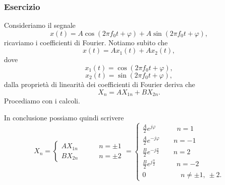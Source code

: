 \documentclass[12pt,oneside,openany]{memoir}
\numberwithin{equation}{subsection}
\begin{document}

\subsubsection{Esercizio}
Consideriamo il segnale
\begin{equation}
	x(t) = A \cos(2 \pi f_0 t + \varphi) + A \sin(2 \pi f_0 t + \varphi),
\end{equation}
ricaviamo i coefficienti di Fourier.
\bigbreak\noindent
Notiamo subito che
\begin{equation}
	x(t) = A x_1(t) + A x_2(t),
\end{equation}
dove
\begin{equation}
	x_1(t) = \cos(2 \pi f_0 t + \varphi),
\end{equation}
\begin{equation}
	x_2(t) = \sin(2 \pi f_0 t + \varphi),
\end{equation}
dalla propriet\`a di linearit\`a dei coefficienti di Fourier deriva che
\begin{equation}
	X_n = A X_{1n} + B X_{2n}.
\end{equation}
Procediamo con i calcoli.

In conclusione possiamo quindi scrivere
\begin{equation}
	X_n =
		\begin{cases}
			A X_{1n} \quad\quad\quad n = \pm 1\\
			B X_{2n} \quad\quad\quad n = \pm 2
		\end{cases}
			=
			\begin{cases}
				\frac{A}{2} e^{j \varphi} \quad\quad\quad n = 1\\
				\frac{A}{2} e^{-j \varphi} \quad\quad n = -1\\
				\frac{B}{2} e^{-j \frac{\pi}{2}} \quad\quad n = 2\\
				\frac{B}{2} e^{j \frac{\pi}{2}} \quad\quad\quad n = -2\\
				0  \quad\quad\quad\quad\quad n \neq \pm 1, \ \pm 2.
			\end{cases}
\end{equation}
\newpage
\end{document}
